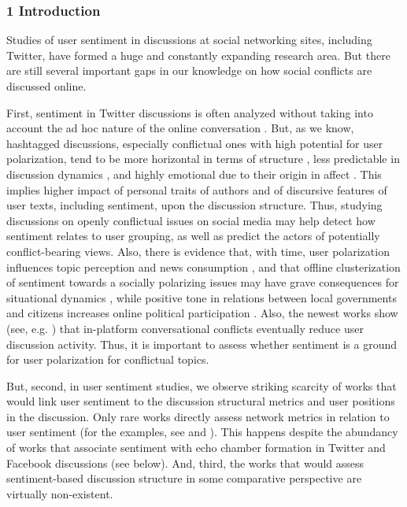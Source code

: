 \subsubsection{1 Introduction}

Studies of user sentiment in discussions at social networking sites, including Twitter, have formed a huge and constantly expanding research area. But there are still several important gaps in our knowledge on how social conflicts are discussed online.

First, sentiment in Twitter discussions is often analyzed without taking into account the ad hoc nature of the online conversation \cite{BrunsBurgess2015}. But, as we know, hashtagged discussions, especially conflictual ones with high potential for user polarization, tend to be more horizontal in terms of structure \cite{BodrunovaBlekanovMaksimov}, less predictable in discussion dynamics \cite{BrunsBurgees2012,BodrunovaLitvinenkoBlekanov2017}, and highly emotional due to their origin in affect \cite{Papacharissi}. This implies higher impact of personal traits of authors and of discursive features of user texts, including sentiment, upon the discussion structure. Thus, studying discussions on openly conflictual issues on social media may help detect how sentiment relates to user grouping, as well as predict the actors of potentially conflict-bearing views. Also, there is evidence that, with time, user polarization influences topic perception and news consumption \cite{DelVicarioZolloCaldarelli}, and that offline clusterization of sentiment towards a socially polarizing issues may have grave consequences for situational dynamics \cite{SalatheKhandelwal}, while positive tone in relations between local governments and citizens increases online political participation \cite{ZavattaroFrenchMohanty}. Also, the newest works show (see, e.g. \cite{KumarHamiltonLeskovec}) that in-platform conversational conflicts eventually reduce user discussion activity. Thus, it is important to assess whether sentiment is a ground for user polarization for conflictual topics.

But, second, in user sentiment studies, we observe striking scarcity of works that would link user sentiment to the discussion structural metrics and user positions in the discussion. Only rare works directly assess network metrics in relation to user sentiment (for the examples, see \cite{StieglitzDangXuan} and \cite{BigonhaCardosoMoro}). This happens despite the abundancy of works that associate sentiment with echo chamber formation in Twitter and Facebook discussions (see below). And, third, the works that would assess sentiment-based discussion structure in some comparative perspective are virtually non-existent.

